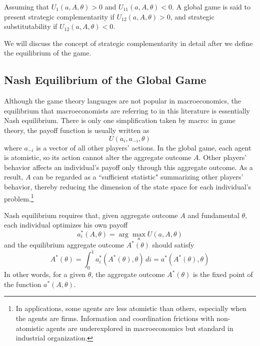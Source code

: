 \documentclass[12pt]{article}
\begin{document}
\begin{definition}
	Assuming that $U_1(a, A, \theta) > 0$ and $U_{11}(a, A, \theta) < 0$. A global game is said to present strategic complementarity if $U_{12}(a, A, \theta) > 0$, and strategic substitutability if $U_{12} (a, A, \theta) < 0$.
\end{definition}

We will discuss the concept of strategic complementarity in detail after we define the equilibrium of the game. 

\subsection{Nash Equilibrium of the Global Game}

Although the game theory languages are not popular in macroeconomics, the equilibrium that macroeconomists are referring to in this literature is essentially Nash equilibrium. There is only one simplification taken by macro: in game theory, the payoff function is usually written as
\[U(a_i, a_{-i}, \theta)\]
where $a_{-i}$ is a vector of all other players' actions. In the global game, each agent is atomistic, so its action cannot alter the aggregate outcome $A$. Other players' behavior affects an individual's payoff only through this aggregate outcome. As a result, $A$ can be regarded as a ``sufficient statistic" summarizing other players' behavior, thereby reducing the dimension of the state space for each individual's problem.\footnote{In applications, some agents are less atomistic than others, especially when the agents are firms. Information and coordination frictions with non-atomistic agents are underexplored in macroeconomics but standard in industrial organization.}

Nash equilibrium requires that, given aggregate outcome $A$ and fundamental $\theta$, each individual optimizes his own payoff 
\begin{equation}
	a^*_i(A, \theta) = \arg \max_{a} U(a, A, \theta)
\end{equation}
and the equilibrium aggregate outcome $A^*(\theta)$ should satisfy
\begin{equation}
	A^*(\theta) = \int_0^1 a_i^*(A^*(\theta), \theta) \, di = a^*(A^*(\theta), \theta) 
\end{equation} 
In other words, for a given $\theta$, the aggregate outcome $A^*(\theta)$ is the fixed point of the function $a^*(A, \theta)$.
\end{document}
